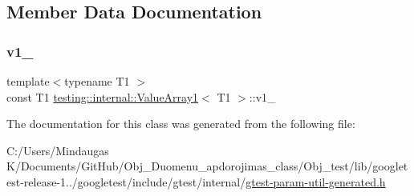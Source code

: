 \subsection{Member Data Documentation}
\mbox{\label{classtesting_1_1internal_1_1_value_array1_ab451e2eaa5ef878e90d83136c50b5432}} 
\subsubsection{\texorpdfstring{v1\_}{v1\_}}
{\footnotesize\ttfamily template$<$typename T1 $>$ \\
const T1 \mbox{\hyperlink{classtesting_1_1internal_1_1_value_array1}{testing\+::internal\+::\+Value\+Array1}}$<$ T1 $>$\+::v1\+\_\+\hspace{0.3cm}{\ttfamily [private]}}



The documentation for this class was generated from the following file\+:\begin{DoxyCompactItemize}
\item 
C\+:/\+Users/\+Mindaugas K/\+Documents/\+Git\+Hub/\+Obj\+\_\+\+Duomenu\+\_\+apdorojimas\+\_\+class/\+Obj\+\_\+test/lib/googletest-\/release-\/1../googletest/include/gtest/internal/\mbox{\hyperlink{gtest-param-util-generated_8h}{gtest-\/param-\/util-\/generated.\+h}}\end{DoxyCompactItemize}
